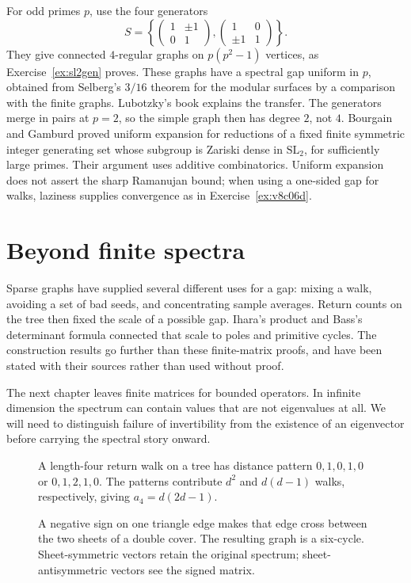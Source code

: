 \begin{remark}
For odd primes $p$, use the four generators
\[
S=\left\{\begin{pmatrix}1&\pm1\\0&1\end{pmatrix},
\begin{pmatrix}1&0\\\pm1&1\end{pmatrix}\right\}.
\]
They give connected $4$-regular graphs on $p(p^2-1)$ vertices, as Exercise~\ref{ex:sl2gen} proves. These graphs have a spectral gap uniform in $p$, obtained from Selberg's $3/16$ theorem for the modular surfaces by a comparison with the finite graphs. Lubotzky's book explains the transfer. The generators merge in pairs at $p=2$, so the simple graph then has degree $2$, not $4$.
Bourgain and Gamburd proved uniform expansion for reductions of a fixed finite symmetric integer generating set whose subgroup is Zariski dense in $\mathrm{SL}_2$, for sufficiently large primes. Their argument uses additive combinatorics. Uniform expansion does not assert the sharp Ramanujan bound; when using a one-sided gap for walks, laziness supplies convergence as in Exercise~\ref{ex:v8c06d}.
\end{remark}

\section{Beyond finite spectra}

Sparse graphs have supplied several different uses for a gap: mixing a walk, avoiding a set of bad seeds, and concentrating sample averages. Return counts on the tree then fixed the scale of a possible gap. Ihara's product and Bass's determinant formula connected that scale to poles and primitive cycles. The construction results go further than these finite-matrix proofs, and have been stated with their sources rather than used without proof.

The next chapter leaves finite matrices for bounded operators. In infinite dimension the spectrum can contain values that are not eigenvalues at all. We will need to distinguish failure of invertibility from the existence of an eigenvector before carrying the spectral story onward.

\begin{figure}[ht]
\centering{}
\caption{A length-four return walk on a tree has distance pattern $0,1,0,1,0$ or $0,1,2,1,0$. The patterns contribute $d^2$ and $d(d-1)$ walks, respectively, giving $a_4=d(2d-1)$.}
\label{fig:v8c07returns}
\end{figure}
\begin{figure}[ht]
\centering{}
\caption{A negative sign on one triangle edge makes that edge cross between the two sheets of a double cover. The resulting graph is a six-cycle. Sheet-symmetric vectors retain the original spectrum; sheet-antisymmetric vectors see the signed matrix.}
\label{fig:v8c07cover}
\end{figure}

